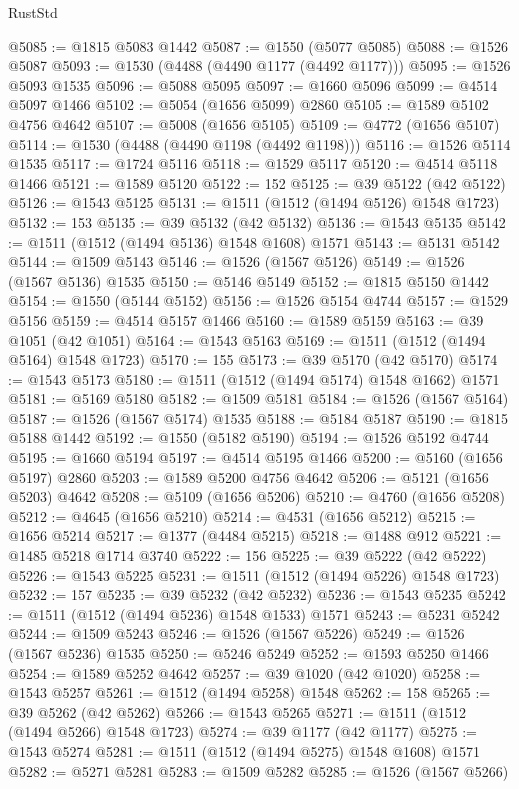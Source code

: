\begin{lexlean}{RustStd}
\begin{coremodule}
{{@5085 := @1815 @5083 @1442
@5087 := @1550 (@5077 @5085)
@5088 := @1526 @5087
@5093 := @1530 (@4488 (@4490 @1177 (@4492 @1177)))
@5095 := @1526 @5093 @1535
@5096 := @5088 @5095
@5097 := @1660 @5096
@5099 := @4514 @5097 @1466
@5102 := @5054 (@1656 @5099) @2860
@5105 := @1589 @5102 @4756 @4642
@5107 := @5008 (@1656 @5105)
@5109 := @4772 (@1656 @5107)
@5114 := @1530 (@4488 (@4490 @1198 (@4492 @1198)))
@5116 := @1526 @5114 @1535
@5117 := @1724 @5116
@5118 := @1529 @5117
@5120 := @4514 @5118 @1466
@5121 := @1589 @5120
@5122 := 152
@5125 := @39 @5122 (@42 @5122)
@5126 := @1543 @5125
@5131 := @1511 (@1512 (@1494 @5126) @1548 @1723)
@5132 := 153
@5135 := @39 @5132 (@42 @5132)
@5136 := @1543 @5135
@5142 := @1511 (@1512 (@1494 @5136) @1548 @1608) @1571
@5143 := @5131 @5142
@5144 := @1509 @5143
@5146 := @1526 (@1567 @5126)
@5149 := @1526 (@1567 @5136) @1535
@5150 := @5146 @5149
@5152 := @1815 @5150 @1442
@5154 := @1550 (@5144 @5152)
@5156 := @1526 @5154 @4744
@5157 := @1529 @5156
@5159 := @4514 @5157 @1466
@5160 := @1589 @5159
@5163 := @39 @1051 (@42 @1051)
@5164 := @1543 @5163
@5169 := @1511 (@1512 (@1494 @5164) @1548 @1723)
@5170 := 155
@5173 := @39 @5170 (@42 @5170)
@5174 := @1543 @5173
@5180 := @1511 (@1512 (@1494 @5174) @1548 @1662) @1571
@5181 := @5169 @5180
@5182 := @1509 @5181
@5184 := @1526 (@1567 @5164)
@5187 := @1526 (@1567 @5174) @1535
@5188 := @5184 @5187
@5190 := @1815 @5188 @1442
@5192 := @1550 (@5182 @5190)
@5194 := @1526 @5192 @4744
@5195 := @1660 @5194
@5197 := @4514 @5195 @1466
@5200 := @5160 (@1656 @5197) @2860
@5203 := @1589 @5200 @4756 @4642
@5206 := @5121 (@1656 @5203) @4642
@5208 := @5109 (@1656 @5206)
@5210 := @4760 (@1656 @5208)
@5212 := @4645 (@1656 @5210)
@5214 := @4531 (@1656 @5212)
@5215 := @1656 @5214
@5217 := @1377 (@4484 @5215)
@5218 := @1488 @912
@5221 := @1485 @5218 @1714 @3740
@5222 := 156
@5225 := @39 @5222 (@42 @5222)
@5226 := @1543 @5225
@5231 := @1511 (@1512 (@1494 @5226) @1548 @1723)
@5232 := 157
@5235 := @39 @5232 (@42 @5232)
@5236 := @1543 @5235
@5242 := @1511 (@1512 (@1494 @5236) @1548 @1533) @1571
@5243 := @5231 @5242
@5244 := @1509 @5243
@5246 := @1526 (@1567 @5226)
@5249 := @1526 (@1567 @5236) @1535
@5250 := @5246 @5249
@5252 := @1593 @5250 @1466
@5254 := @1589 @5252 @4642
@5257 := @39 @1020 (@42 @1020)
@5258 := @1543 @5257
@5261 := @1512 (@1494 @5258) @1548
@5262 := 158
@5265 := @39 @5262 (@42 @5262)
@5266 := @1543 @5265
@5271 := @1511 (@1512 (@1494 @5266) @1548 @1723)
@5274 := @39 @1177 (@42 @1177)
@5275 := @1543 @5274
@5281 := @1511 (@1512 (@1494 @5275) @1548 @1608) @1571
@5282 := @5271 @5281
@5283 := @1509 @5282
@5285 := @1526 (@1567 @5266)
}}
\end{coremodule}
\end{lexlean}
